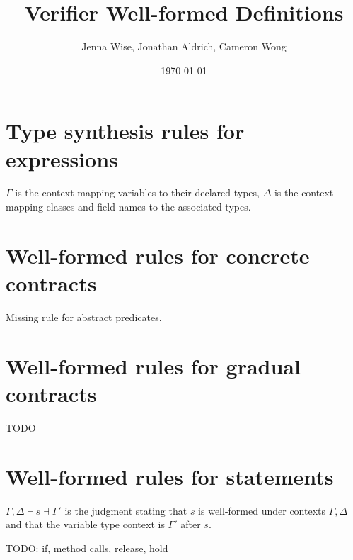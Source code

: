 \documentclass {article}
\title {Verifier Well-formed Definitions}
\author {Jenna Wise, Jonathan Aldrich, Cameron Wong}
\date {\today}
\newcommand{\acc}[1]{\text{acc}(#1)}
\newcommand{\intty}{int}
\newcommand{\tyctx}{\Gamma}
\newcommand{\clsctx}{\Delta}
\newcommand{\derives}[2]{#1 \vdash #2}
\newcommand{\tyderives}[3][\tyctx,\clsctx]{\derives{#1}{#2 : #3}}
\newcommand{\isok}[2][\tyctx,\clsctx]{\derives{#1}{#2 \ \textsc{ok}}}
\newcommand{\begets}[2]{#1 \dashv #2}
\newcommand{\stmwf}[3][\tyctx,\clsctx]{\derives{#1}{\begets{#2}{#3}}}
\begin{document}
\maketitle

\section{Type synthesis rules for expressions}

$\tyctx$ is the context mapping variables to their declared types, $\clsctx$ is
the context mapping classes and field names to the associated types.


\section{Well-formed rules for concrete contracts}

Missing rule for abstract predicates.


\section{Well-formed rules for gradual contracts}

TODO

\section{Well-formed rules for statements}

$\stmwf{s}{\tyctx'}$ is the judgment stating that $s$ is well-formed under
contexts $\tyctx,\clsctx$ and that the variable type context is $\tyctx'$ after
$s$.

TODO: if, method calls, release, hold

\end{document}
